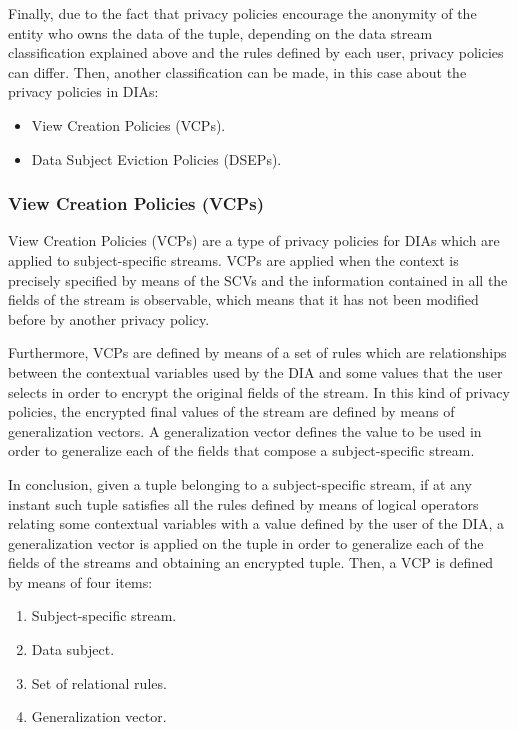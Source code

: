 Finally, due to the fact that privacy policies encourage the anonymity of the entity who owns the data of the tuple, depending on the data stream classification explained above and the rules defined by each user, privacy policies can differ. Then, another classification can be made, in this case about the privacy policies in DIAs:

\begin{itemize}

\item View Creation Policies (VCPs).
\item Data Subject Eviction Policies (DSEPs).

\end{itemize}

\subsubsection{View Creation Policies (VCPs)}

View Creation Policies (VCPs) are a type of privacy policies for DIAs which are applied to subject-specific streams. VCPs are applied when the context is precisely specified by means of the SCVs and the information contained in all the fields of the stream is observable, which means that it has not been modified before by another privacy policy.

Furthermore, VCPs are defined by means of a set of rules which are relationships between the contextual variables used by the DIA and some values that the user selects in order to encrypt the original fields of the stream. In this kind of privacy policies, the encrypted final values of the stream are defined by means of generalization vectors. A generalization vector defines the value to be used in order to generalize each of the fields that compose a subject-specific stream.

In conclusion, given a tuple belonging to a subject-specific stream, if at any instant such tuple satisfies all the rules defined by means of logical operators relating some contextual variables with a value defined by the user of the DIA, a generalization vector is applied on the tuple in order to generalize each of the fields of the streams and obtaining an encrypted tuple. Then, a VCP is defined by means of four items:

\begin{enumerate}

\item Subject-specific stream.
\item Data subject.
\item Set of relational rules.
\item Generalization vector.

\end{enumerate}

